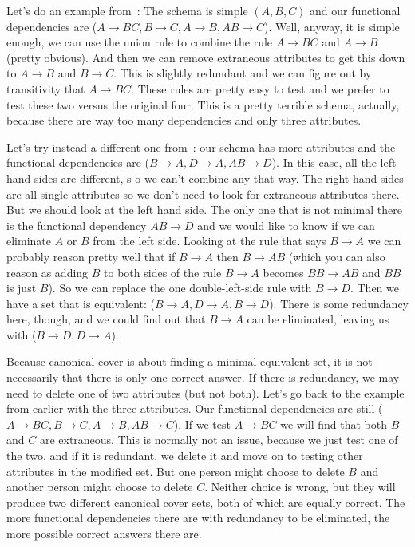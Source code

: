 Let's do an example from~\cite{dsc}: The schema is simple $(A, B, C)$ and our functional dependencies are ($A \rightarrow BC, B \rightarrow C, A \rightarrow B, AB \rightarrow C$). Well, anyway, it is simple enough, we can use the union rule to combine the rule $A \rightarrow BC$ and $A \rightarrow B$ (pretty obvious). And then we can remove extraneous attributes to get this down to $A \rightarrow B$ and $B \rightarrow C$. This is slightly redundant and we can figure out by transitivity that $A \rightarrow BC$. These rules are pretty easy to test and we prefer to test these two versus the original four. This is a pretty terrible schema, actually, because there are way too many dependencies and only three attributes. 

Let's try instead a different one from~\cite{fds}: our schema has more attributes and the functional dependencies are ($B \rightarrow A, D \rightarrow A, AB \rightarrow D$). In this case, all the left hand sides are different, s o we can't combine any that way. The right hand sides are all single attributes so we don't need to look for extraneous attributes there. But we should look at the left hand side. The only one that is not minimal there is the functional dependency $AB \rightarrow D$ and we would like to know if we can eliminate $A$ or $B$ from the left side. Looking at the rule that says $B \rightarrow A$ we can probably reason pretty well that if $B \rightarrow A$ then $B \rightarrow AB$  (which you can also reason as adding $B$ to both sides of the rule $B \rightarrow A$ becomes $BB \rightarrow AB$ and $BB$ is just $B$). So we can replace the one double-left-side rule with $B \rightarrow D$. Then we have a set that is equivalent: ($B \rightarrow A, D \rightarrow A, B \rightarrow D$). There is some redundancy here, though, and we could find out that $B \rightarrow A$ can be eliminated, leaving us with ($B \rightarrow D, D \rightarrow A$).

Because canonical cover is about finding a minimal equivalent set, it is not necessarily that there is only one correct answer. If there is redundancy, we may need to delete one of two attributes (but not both). Let's go back to the example from earlier with the three attributes. Our functional dependencies are still ($A \rightarrow BC, B \rightarrow C, A \rightarrow B, AB \rightarrow C$). If we test $A \rightarrow BC$ we will find that both $B$ and $C$ are extraneous. This is normally not an issue, because we just test one of the two, and if it is redundant, we delete it and move on to testing other attributes in the modified set. But one person might choose to delete $B$ and another person might choose to delete $C$. Neither choice is wrong, but they will produce two different canonical cover sets, both of which are equally correct. The more functional dependencies there are with redundancy to be eliminated, the more possible correct answers there are. 


